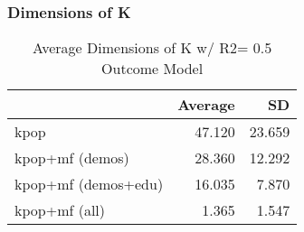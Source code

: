 \documentclass[
]{article}
\begin{document}
\hypertarget{dimensions-of-k}{%
\subsubsection{Dimensions of K}\label{dimensions-of-k}}

\begin{table}[!h]

\caption{\label{tab:unnamed-chunk-8}Average Dimensions of K w/ R2= 0.5 Outcome Model}
\centering
\begin{tabular}[t]{lrr}
\toprule
  & Average & SD\\
\midrule
kpop & 47.120 & 23.659\\
kpop+mf (demos) & 28.360 & 12.292\\
kpop+mf (demos+edu) & 16.035 & 7.870\\
kpop+mf (all) & 1.365 & 1.547\\
\bottomrule
\end{tabular}
\end{table}
\end{document}
